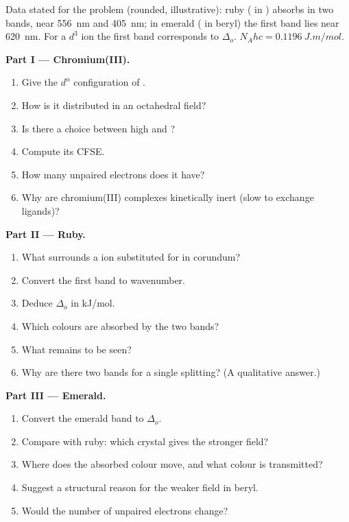 \begin{problem}
\label{pb:b2:ligand-field:1}
Data stated for the problem (rounded, illustrative): ruby ( in ) absorbs
in two bands, near \qty{556}{nm} and \qty{405}{nm}; in emerald ( in beryl) the
first band lies near \qty{620}{nm}. For a $d^3$ ion the first band corresponds to
$\Delta_o$. $N_Ahc = \qty{0.1196}{J.m/mol}$.

\medskip
\noindent\textbf{Part I --- Chromium(III).}
\begin{enumerate}
  \item Give the $d^n$ configuration of .
  \item How is it distributed in an octahedral field?
  \item Is there a choice between high and ?
  \item Compute its CFSE.
  \item How many unpaired electrons does it have?
  \item Why are chromium(III) complexes kinetically inert (slow to exchange ligands)?
\end{enumerate}

\medskip
\noindent\textbf{Part II --- Ruby.}
\begin{enumerate}[resume]
  \item What surrounds a  ion substituted for  in corundum?
  \item Convert the first band to wavenumber.
  \item Deduce $\Delta_o$ in \unit{kJ/mol}.
  \item Which colours are absorbed by the two bands?
  \item What remains to be seen?
  \item Why are there two bands for a single splitting? (A qualitative answer.)
\end{enumerate}

\medskip
\noindent\textbf{Part III --- Emerald.}
\begin{enumerate}[resume]
  \item Convert the emerald band to $\Delta_o$.
  \item Compare with ruby: which crystal gives the stronger field?
  \item Where does the absorbed colour move, and what colour is transmitted?
  \item Suggest a structural reason for the weaker field in beryl.
  \item Would the number of unpaired electrons change?
\end{enumerate}


\end{problem}
